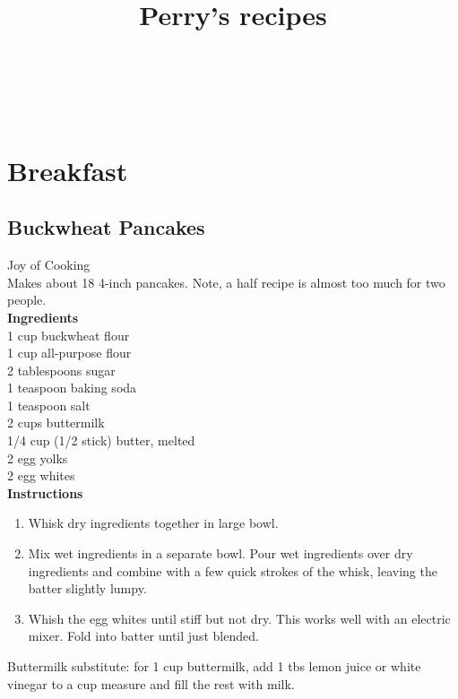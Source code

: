 \documentclass{article}
\numberwithin{figure}{section}
\numberwithin{equation}{section}
\begin{document}
	\author{}
	\title{Perry's recipes}
	\date{}
	\maketitle
	\tableofcontents
	\underline{\hspace{6in}} \\ \\


\pagebreak
\section{Breakfast}

\pagebreak
\subsection{Buckwheat Pancakes}
Joy of Cooking\\
Makes about 18 4-inch pancakes. Note, a half recipe is almost too much for two people.\\

{\bf Ingredients}\\
1 cup buckwheat flour\\
1 cup all-purpose flour\\
2 tablespoons sugar\\
1 teaspoon baking soda\\
1 teaspoon salt\\
2 cups buttermilk\\
1/4 cup (1/2 stick) butter, melted\\
2 egg yolks\\
2 egg whites\\

{\bf Instructions}\\
\begin{enumerate}
\item Whisk dry ingredients together in large bowl.
\item Mix wet ingredients in a separate bowl. Pour wet ingredients over dry ingredients and combine with a few quick strokes of the whisk, leaving the batter slightly lumpy.
\item Whish the egg whites until stiff but not dry. This works well with an electric mixer. Fold into batter until just blended.
\end{enumerate}

Buttermilk substitute: for 1 cup buttermilk, add 1 tbs lemon juice or white vinegar to a cup measure and fill the rest with milk.
\end{document}
